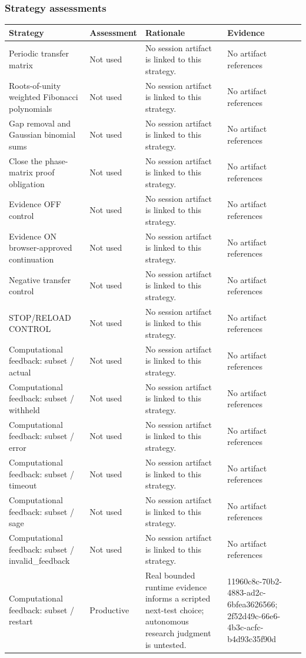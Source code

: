 \documentclass[11pt]{article}
\begin{document}
\subsubsection*{Strategy assessments}
\begin{longtable}{>{\raggedright\arraybackslash}p{.16\linewidth}>{\raggedright\arraybackslash}p{.15\linewidth}>{\raggedright\arraybackslash}p{.40\linewidth}>{\raggedright\arraybackslash}p{.17\linewidth}}
\toprule Strategy & Assessment & Rationale & Evidence \\
\midrule\endhead
Periodic transfer matrix & Not used & No session artifact is linked to this strategy. & No artifact references \\
Roots-of-unity weighted Fibonacci polynomials & Not used & No session artifact is linked to this strategy. & No artifact references \\
Gap removal and Gaussian binomial sums & Not used & No session artifact is linked to this strategy. & No artifact references \\
Close the phase-matrix proof obligation & Not used & No session artifact is linked to this strategy. & No artifact references \\
Evidence OFF control & Not used & No session artifact is linked to this strategy. & No artifact references \\
Evidence ON browser-approved continuation & Not used & No session artifact is linked to this strategy. & No artifact references \\
Negative transfer control & Not used & No session artifact is linked to this strategy. & No artifact references \\
STOP/RELOAD CONTROL & Not used & No session artifact is linked to this strategy. & No artifact references \\
Computational feedback: subset / actual & Not used & No session artifact is linked to this strategy. & No artifact references \\
Computational feedback: subset / withheld & Not used & No session artifact is linked to this strategy. & No artifact references \\
Computational feedback: subset / error & Not used & No session artifact is linked to this strategy. & No artifact references \\
Computational feedback: subset / timeout & Not used & No session artifact is linked to this strategy. & No artifact references \\
Computational feedback: subset / sage & Not used & No session artifact is linked to this strategy. & No artifact references \\
Computational feedback: subset / invalid\_feedback & Not used & No session artifact is linked to this strategy. & No artifact references \\
Computational feedback: subset / restart & Productive & Real bounded runtime evidence informs a scripted next-test choice; autonomous research judgment is untested. & 11960c8c-70b2-4883-ad2c-6bfea3626566; 2f52d49c-66e6-4b3c-acfc-b4d93c35f90d \\
\bottomrule
\end{longtable}
\end{document}
